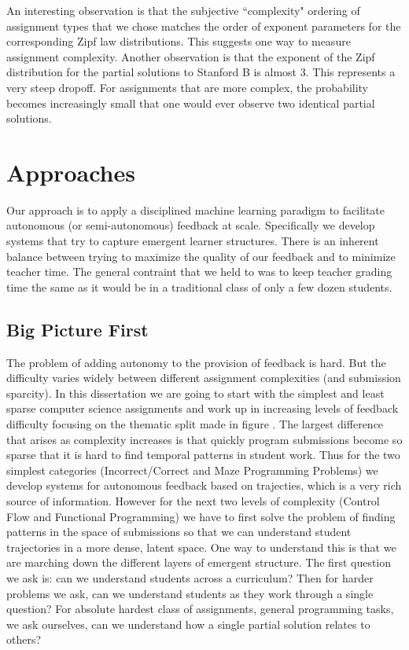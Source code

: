  An interesting observation is that the subjective ``complexity" ordering of assignment types that we chose matches the order of exponent parameters for the corresponding Zipf law distributions. This suggests one way to measure assignment complexity. Another observation is that the exponent of the Zipf distribution for the partial solutions to Stanford B is almost 3. This represents a very steep dropoff. For assignments that are more complex, the probability becomes increasingly small that one would ever observe two identical partial solutions.

\section{Approaches}

Our approach is to apply a disciplined machine learning paradigm to facilitate autonomous (or semi-autonomous) feedback at scale. Specifically we develop systems that try to capture emergent learner structures. There is an inherent balance between trying to maximize the quality of our feedback and to minimize teacher time. The general contraint that we held to was to keep teacher grading time the same as it would be in a traditional class of only a few dozen students.

\subsection{Big Picture First}

The problem of adding autonomy to the provision of feedback is hard. But the difficulty varies widely between different assignment complexities (and submission sparcity). In this dissertation we are going to start with the simplest and least sparse computer science assignments and work up in increasing levels of feedback difficulty focusing on the thematic split made in figure \cite{fig:assnTypes}. The largest difference that arises as complexity increases is that quickly program submissions become so sparse that it is hard to find temporal patterns in student work. Thus for the two simplest categories (Incorrect/Correct and Maze Programming Problems) we develop systems for autonomous feedback based on trajecties, which is a very rich source of information. However for the next two levels of complexity (Control Flow and Functional Programming) we have to first solve the problem of finding patterns in the space of submissions so that we can understand student trajectories in a more dense, latent space. One way to understand this is that we are marching down the different layers of emergent structure. The first question we ask is: can we understand students across a curriculum? Then for harder problems we ask, can we understand students as they work through a single question? For absolute hardest class of assignments, general programming tasks, we ask ourselves, can we understand how a single partial solution relates to others?

